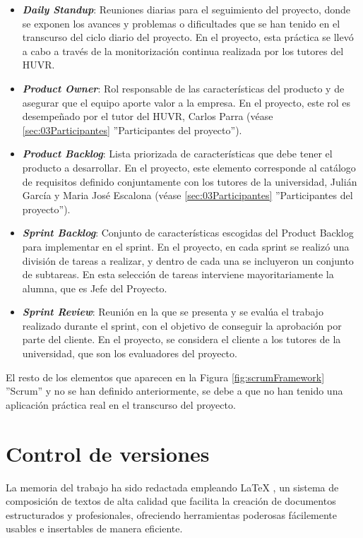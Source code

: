 \begin{itemize}
    \item \textbf{\textit{Daily Standup}}: Reuniones diarias para el seguimiento del proyecto, donde se exponen los avances y problemas o dificultades que se han tenido en el transcurso del ciclo diario del proyecto. En el proyecto, esta práctica se llevó a cabo a través de la monitorización continua realizada por los tutores del HUVR.
    \item \textbf{\textit{Product Owner}}: Rol responsable de las características del producto y de asegurar que el equipo aporte valor a la empresa. En el proyecto, este rol es desempeñado por el tutor del HUVR, Carlos Parra (véase \ref{sec:03Participantes} ''Participantes del proyecto'').
    \item \textbf{\textit{Product Backlog}}: Lista priorizada de características que debe tener el producto a desarrollar. En el proyecto, este elemento corresponde al catálogo de requisitos definido conjuntamente con los tutores de la universidad, Julián García y Maria José Escalona (véase \ref{sec:03Participantes} ''Participantes del proyecto'').
    \item \textbf{\textit{Sprint Backlog}}: Conjunto de características escogidas del Product Backlog para implementar en el sprint. En el proyecto, en cada sprint se realizó una división de tareas a realizar, y dentro de cada una se incluyeron un conjunto de subtareas. En esta selección de tareas interviene mayoritariamente la alumna, que es Jefe del Proyecto.
    \item \textbf{\textit{Sprint Review}}: Reunión en la que se presenta y se evalúa el trabajo realizado durante el sprint, con el objetivo de conseguir la aprobación por parte del cliente. En el proyecto, se considera el cliente a los tutores de la universidad, que son los evaluadores del proyecto.
\end{itemize}

El resto de los elementos que aparecen en la Figura \ref{fig:scrumFramework} ''Scrum'' y no se han definido anteriormente, se debe a que no han tenido una aplicación práctica real en el transcurso del proyecto.

\section{Control de versiones} \label{sec:04cvs}

La memoria del trabajo ha sido redactada empleando LaTeX \cite{latex}, un sistema de composición de textos de alta calidad que facilita la creación de documentos estructurados y profesionales, ofreciendo herramientas poderosas fácilemente usables e insertables de manera eficiente.

